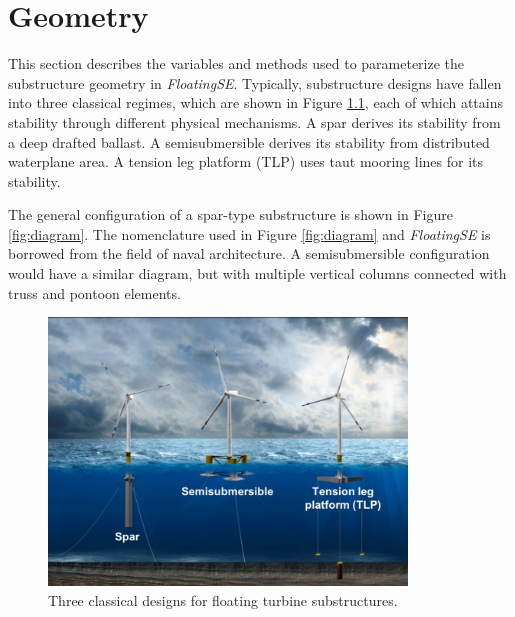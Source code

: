 \chapter{Geometry}
\label{sec:geom}
This section describes the variables and methods used to parameterize
the substructure geometry in \textit{FloatingSE}.  Typically,
substructure designs have fallen into three classical regimes, which are
shown in Figure \ref{fig:archetype}, each of which attains stability
through different physical mechanisms.  A spar derives its stability from a
deep drafted ballast.  A semisubmersible derives its stability from
distributed waterplane area.  A tension leg platform (TLP) uses taut
mooring lines for its stability.

The general configuration of a
spar-type substructure is shown in Figure \ref{fig:diagram}.  The
nomenclature used in Figure \ref{fig:diagram} and \textit{FloatingSE} is
borrowed from the field of naval architecture.  A semisubmersible
configuration would have a similar diagram, but with multiple vertical
columns connected with truss and pontoon elements.
%
\begin{figure}[htb]
  \begin{center}
    \includegraphics[width=3.75in]{figs/archetypes.pdf}
    \caption{Three classical designs for floating turbine substructures.}
    \label{fig:archetype}
  \end{center}
\end{figure}
%
